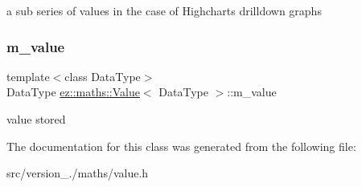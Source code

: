 a sub series of values in the case of Highcharts drilldown graphs \mbox{\label{classez_1_1maths_1_1Value_a7894cb6036753caeed0443ccd38f2116}} 
\subsubsection{\texorpdfstring{m\+\_\+value}{m\_value}}
{\footnotesize\ttfamily template$<$class Data\+Type$>$ \\
Data\+Type \hyperlink{classez_1_1maths_1_1Value}{ez\+::maths\+::\+Value}$<$ Data\+Type $>$\+::m\+\_\+value}

value stored 

The documentation for this class was generated from the following file\+:\begin{DoxyCompactItemize}
\item 
src/version\+\_./maths/value.\+h\end{DoxyCompactItemize}
